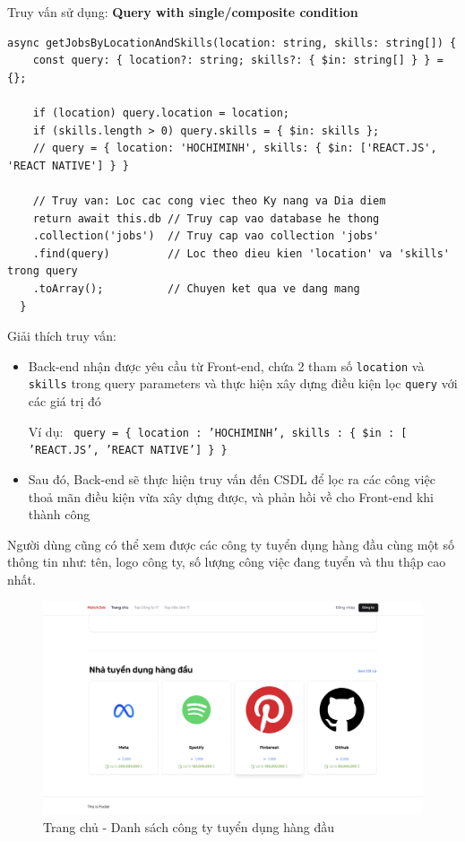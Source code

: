 Truy vấn sử dụng: \textbf{Query with single/composite condition}

\begin{lstlisting}
async getJobsByLocationAndSkills(location: string, skills: string[]) {
    const query: { location?: string; skills?: { $in: string[] } } = {};

    if (location) query.location = location; 
    if (skills.length > 0) query.skills = { $in: skills }; 
    // query = { location: 'HOCHIMINH', skills: { $in: ['REACT.JS', 'REACT NATIVE'] } }

    // Truy van: Loc cac cong viec theo Ky nang va Dia diem
    return await this.db // Truy cap vao database he thong
    .collection('jobs')  // Truy cap vao collection 'jobs'
    .find(query)         // Loc theo dieu kien 'location' va 'skills' trong query
    .toArray();          // Chuyen ket qua ve dang mang
  }
\end{lstlisting}

Giải thích truy vấn:
\begin{itemize}
    \item Back-end nhận được yêu cầu từ Front-end, chứa 2 tham số \texttt{location} và \texttt{skills} trong query parameters và thực hiện xây dựng điều kiện lọc \texttt{query} với các giá trị đó
    
    Ví dụ: \texttt{ query = \{ location : ’HOCHIMINH’, skills : \{ \$in : [ ’REACT.JS’, ’REACT NATIVE’] \} \} }

    \item Sau đó, Back-end sẽ thực hiện truy vấn đến CSDL để lọc ra các công việc thoả mãn điều kiện vừa xây dựng được, và phản hồi về cho Front-end khi thành công
\end{itemize}

Người dùng cũng có thể xem được các công ty tuyển dụng hàng đầu cùng một số thông tin như: tên, logo công ty, số lượng công việc đang tuyển và thu thập cao nhất.

\begin{figure}[H]
    \centering
    \includegraphics[width=\linewidth]{DBMS-Application/Images/user-screen-company.png}
    \caption{Trang chủ - Danh sách công ty tuyển dụng hàng đầu}
    \label{fig:homepage-company}
\end{figure}


